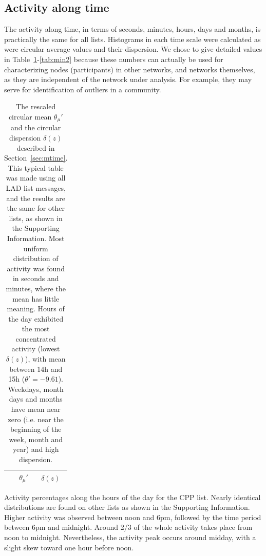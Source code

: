 \documentclass[%
	aip,
	jmp,%
	amsmath,amssymb,
	reprint,%
]{revtex4-1}
\begin{document}
\subsection{Activity along time}\label{constDisc}
The activity along time, in terms of seconds, minutes, hours, days and months,  is practically the same for all lists.
Histograms in each time scale were calculated as were circular average values and their dispersion.
We chose to give detailed values in Table~\ref{tab:circ}-\ref{tab:min2} because these numbers can actually be used for characterizing nodes (participants) in other networks, and networks themselves, as they are independent of the network under analysis. For example, they may serve for identification of outliers in a community.

\begin{table}
	\caption{The rescaled circular mean $\theta_\mu'$ and the circular dispersion $\delta(z)$ described in Section~\ref{sec:mtime}.
	This typical table was made using all LAD list messages, and the results are the same for other lists, as shown in the Supporting Information.
	Most uniform distribution of activity was found in seconds and minutes, where the mean has little meaning.
	Hours of the day exhibited the most concentrated activity (lowest $\delta(z)$), with mean between 14h and 15h ($\theta'=-9.61$).
	Weekdays, month days and months have mean near zero (i.e. near the beginning of the week, month and year) and high dispersion.}
	\begin{center}
		\begin{tabular}{ |l|| c|c| }
			\hline
			& $\theta_\mu'$ & $\delta(z)$  \\ \hline\hline
			
		\end{tabular}
	\end{center}
	\label{tab:circ}
\end{table}

\begin{table}
	\caption{Activity percentages along the hours of the day for the CPP list. Nearly identical distributions are found on other lists as shown in the Supporting Information. Higher activity was observed between noon and 6pm, followed by the time period between 6pm and midnight. Around 2/3 of the whole activity takes place from noon to midnight. Nevertheless, the activity peak occurs around midday, with a slight skew toward one hour before noon.}
	\footnotesize
	
	\label{tab:hin}
\end{table}
\end{document}
